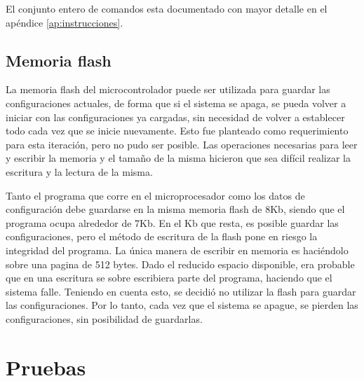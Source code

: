El conjunto entero de comandos esta documentado con mayor detalle en el apéndice \ref{ap:instrucciones}.

\subsection{Memoria flash} %
\label{it5:sub:memoria_flash}

La memoria flash del microcontrolador puede ser utilizada para guardar las configuraciones actuales, de forma que si el sistema se apaga, se pueda volver a iniciar con las configuraciones ya cargadas, sin necesidad de volver a establecer todo cada vez que se inicie nuevamente. Esto fue planteado como requerimiento para esta iteración, pero no pudo ser posible. Las operaciones necesarias para leer y escribir la memoria y el tamaño de la misma hicieron que sea difícil realizar la escritura y la lectura de la misma.

Tanto el programa que corre en el microprocesador como los datos de configuración debe guardarse en la misma memoria flash de 8Kb, siendo que el programa ocupa alrededor de 7Kb. En el Kb que resta, es posible guardar las configuraciones, pero el método de escritura de la flash pone en riesgo la integridad del programa. La única manera de escribir en memoria es haciéndolo sobre una pagina de 512 bytes. Dado el reducido espacio disponible, era probable que en una escritura se sobre escribiera parte del programa, haciendo que el sistema falle.
Teniendo en cuenta esto, se decidió no utilizar la flash para guardar las configuraciones. Por lo tanto, cada vez que el sistema se apague, se pierden las configuraciones, sin posibilidad de guardarlas.



\section{Pruebas} %
\label{it5:sec:pruebas}

